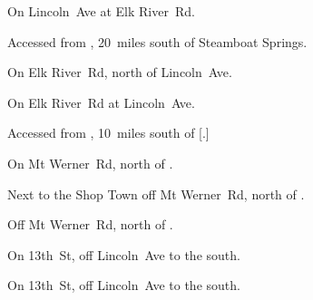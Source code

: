 
\begin{LocationList}

On  Lincoln~Ave at Elk River~Rd.

Accessed from , 20~miles south of Steamboat Springs.

\Location{\GarageHQ \Garage}
On Elk River~Rd, north of  Lincoln~Ave.

\Location{\GasStation \Gas}
On Elk River~Rd at  Lincoln~Ave.

Accessed from , 10~miles south of [.]

On Mt Werner~Rd, north of .

\Location{\RestArea \Rest}
Next to the Shop Town off Mt Werner~Rd, north of .

Off Mt Werner~Rd, north of .

\Location{\TruckService \Service}
On 13th~St, off  Lincoln~Ave to the south.

On 13th~St, off  Lincoln~Ave to the south.

\end{LocationList}
